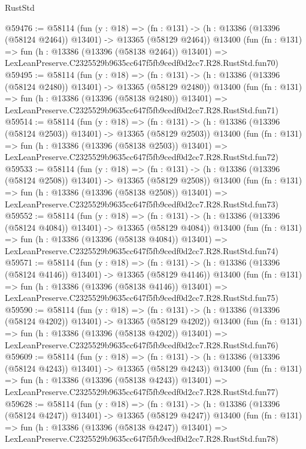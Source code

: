 \begin{lexlean}{RustStd}
\begin{coremodule}
@59476 := @58114
    (fun (y : @18) =>
    (fn : @131) -> (h : @13386 (@13396 (@58124 @2464)) @13401) -> @13365 (@58129 @2464))
    @13400
    (fun (fn : @131) =>
    fun (h : @13386 (@13396 (@58138 @2464)) @13401) =>
    LexLeanPreserve.C2325529b9635cc647f5fb9cedf0d2cc7.R28.RustStd.fun70)
@59495 := @58114
    (fun (y : @18) =>
    (fn : @131) -> (h : @13386 (@13396 (@58124 @2480)) @13401) -> @13365 (@58129 @2480))
    @13400
    (fun (fn : @131) =>
    fun (h : @13386 (@13396 (@58138 @2480)) @13401) =>
    LexLeanPreserve.C2325529b9635cc647f5fb9cedf0d2cc7.R28.RustStd.fun71)
@59514 := @58114
    (fun (y : @18) =>
    (fn : @131) -> (h : @13386 (@13396 (@58124 @2503)) @13401) -> @13365 (@58129 @2503))
    @13400
    (fun (fn : @131) =>
    fun (h : @13386 (@13396 (@58138 @2503)) @13401) =>
    LexLeanPreserve.C2325529b9635cc647f5fb9cedf0d2cc7.R28.RustStd.fun72)
@59533 := @58114
    (fun (y : @18) =>
    (fn : @131) -> (h : @13386 (@13396 (@58124 @2508)) @13401) -> @13365 (@58129 @2508))
    @13400
    (fun (fn : @131) =>
    fun (h : @13386 (@13396 (@58138 @2508)) @13401) =>
    LexLeanPreserve.C2325529b9635cc647f5fb9cedf0d2cc7.R28.RustStd.fun73)
@59552 := @58114
    (fun (y : @18) =>
    (fn : @131) -> (h : @13386 (@13396 (@58124 @4084)) @13401) -> @13365 (@58129 @4084))
    @13400
    (fun (fn : @131) =>
    fun (h : @13386 (@13396 (@58138 @4084)) @13401) =>
    LexLeanPreserve.C2325529b9635cc647f5fb9cedf0d2cc7.R28.RustStd.fun74)
@59571 := @58114
    (fun (y : @18) =>
    (fn : @131) -> (h : @13386 (@13396 (@58124 @4146)) @13401) -> @13365 (@58129 @4146))
    @13400
    (fun (fn : @131) =>
    fun (h : @13386 (@13396 (@58138 @4146)) @13401) =>
    LexLeanPreserve.C2325529b9635cc647f5fb9cedf0d2cc7.R28.RustStd.fun75)
@59590 := @58114
    (fun (y : @18) =>
    (fn : @131) -> (h : @13386 (@13396 (@58124 @4202)) @13401) -> @13365 (@58129 @4202))
    @13400
    (fun (fn : @131) =>
    fun (h : @13386 (@13396 (@58138 @4202)) @13401) =>
    LexLeanPreserve.C2325529b9635cc647f5fb9cedf0d2cc7.R28.RustStd.fun76)
@59609 := @58114
    (fun (y : @18) =>
    (fn : @131) -> (h : @13386 (@13396 (@58124 @4243)) @13401) -> @13365 (@58129 @4243))
    @13400
    (fun (fn : @131) =>
    fun (h : @13386 (@13396 (@58138 @4243)) @13401) =>
    LexLeanPreserve.C2325529b9635cc647f5fb9cedf0d2cc7.R28.RustStd.fun77)
@59628 := @58114
    (fun (y : @18) =>
    (fn : @131) -> (h : @13386 (@13396 (@58124 @4247)) @13401) -> @13365 (@58129 @4247))
    @13400
    (fun (fn : @131) =>
    fun (h : @13386 (@13396 (@58138 @4247)) @13401) =>
    LexLeanPreserve.C2325529b9635cc647f5fb9cedf0d2cc7.R28.RustStd.fun78)

\end{coremodule}
\end{lexlean}
